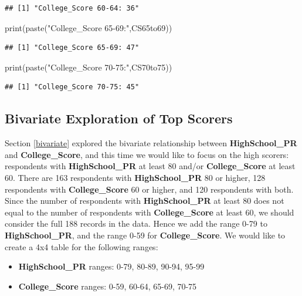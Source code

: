 \documentclass[
]{article}
\newenvironment{Shaded}{\begin{snugshade}}{\end{snugshade}}
\newcommand{\FunctionTok}[1]{\textcolor[rgb]{0.00,0.00,0.00}{#1}}
\newcommand{\NormalTok}[1]{#1}
\newcommand{\StringTok}[1]{\textcolor[rgb]{0.31,0.60,0.02}{#1}}
\providecommand{\tightlist}{%
  \setlength{\itemsep}{0pt}\setlength{\parskip}{0pt}}
\begin{document}
\begin{verbatim}
## [1] "College_Score 60-64: 36"
\end{verbatim}

\begin{Shaded}
\begin{Highlighting}[]
\FunctionTok{print}\NormalTok{(}\FunctionTok{paste}\NormalTok{(}\StringTok{"College\_Score 65{-}69:"}\NormalTok{,CS65to69))}
\end{Highlighting}
\end{Shaded}

\begin{verbatim}
## [1] "College_Score 65-69: 47"
\end{verbatim}

\begin{Shaded}
\begin{Highlighting}[]
\FunctionTok{print}\NormalTok{(}\FunctionTok{paste}\NormalTok{(}\StringTok{"College\_Score 70{-}75:"}\NormalTok{,CS70to75))}
\end{Highlighting}
\end{Shaded}

\begin{verbatim}
## [1] "College_Score 70-75: 45"
\end{verbatim}

\hypertarget{bivariate-top-scorers}{%
\subsection{Bivariate Exploration of Top
Scorers}\label{bivariate-top-scorers}}

Section \ref{bivariate} explored the bivariate relationship between
\textbf{HighSchool\_PR} and \textbf{College\_Score}, and this time we
would like to focus on the high scorers: respondents with
\textbf{HighSchool\_PR} at least 80 and/or \textbf{College\_Score} at
least 60. There are 163 respondents with \textbf{HighSchool\_PR} 80 or
higher, 128 respondents with \textbf{College\_Score} 60 or higher, and
120 respondents with both. Since the number of respondents with
\textbf{HighSchool\_PR} at least 80 does not equal to the number of
respondents with \textbf{College\_Score} at least 60, we should consider
the full 188 records in the data. Hence we add the range 0-79 to
\textbf{HighSchool\_PR}, and the range 0-59 for \textbf{College\_Score}.
We would like to create a 4x4 table for the following ranges:

\begin{itemize}
\tightlist
\item
  \textbf{HighSchool\_PR} ranges: 0-79, 80-89, 90-94, 95-99
\item
  \textbf{College\_Score} ranges: 0-59, 60-64, 65-69, 70-75
\end{itemize}
\end{document}
